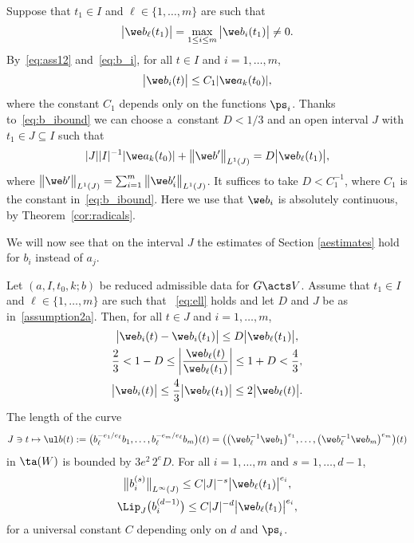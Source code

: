 Suppose that $t_1 \in I$ and $\ell \in \{1,\dots,m\}$ are such that
\begin{gather} \label{eq:ell}
\big |\we b_\ell(t_1)\big| = \max_{1 \le i \le m}\big |\we b_i(t_1)\big| \ne 0.
\end{gather}
By~\eqref{eq:ass12} and~\eqref{eq:b_i}, for all $t \in I$ and $i = 1,\dots,m$,
 \begin{gather} \label{eq:b_ibound}
\big|\we b_i(t) \big| \le C_1 |\we a_k (t_0)|,
 \end{gather}
where the constant $C_1$ depends only on the functions $\ps_i$.
Thanks to~\eqref{eq:b_ibound} we can choose
a~con\-stant $D< 1/3$ and an open interval $J$ with $t_1 \in J \subseteq I$ such that
\begin{gather} \label{assumption2a}
 | J| |I|^{-1} {|\we a_k(t_0)|}
 + \big\|\we b '\big\|_{L^1 (J)} = D \big|\we b_\ell(t_1)\big|,
\end{gather}
where $\big\|\we b '\big\|_{L^1 (J)} = \sum_{i=1}^m\big \|\we b_i '\big\|_{L^1 (J)}$.
It suffices to take $D < C_1^{-1}$, where $C_1$ is the constant in~\eqref{eq:b_ibound}.
Here we use that $\we b _i$ is absolutely continuous,
by Theorem~\ref{cor:radicals}.

We will now see that on the interval $J$ the estimates of Section \ref{aestimates} hold for $b_i$
instead of $a_j$.


\begin{Lemma} \label{lemB}
 Let $(a, I, t_0, k; b)$ be reduced admissible data for $G \acts V$.
 Assume that $t_1 \in I$ and $\ell \in \{1,\dots,m\}$ are such that
~\eqref{eq:ell} holds and
 let $D$ and $J$ be as in~\eqref{assumption2a}.
 Then,
 for all $t \in J$ and $i = 1,\dots,m$,
 \begin{gather}
 \big| \we b_i (t) - \we b_i (t_1)\big| \le D \big|\we b_\ell (t_1)\big|, \label{b1}
 \\
 \frac 2 3 < 1-D \le \left | \frac{\we b_\ell(t)}{\we b_\ell(t_1)} \right| \le 1+D < \frac 4 3,
 \label{b2}
 \\
 \big|\we b_i(t)\big|\le \frac 4 3 \big|\we b_\ell(t_1)\big| \le 2 \big|\we b_\ell(t)\big|. \label{b3}
 \end{gather}
 The length of the curve
 \begin{gather*}
 J \ni t \mapsto \ul b(t)
 := \big( b_\ell^{-e_1/e_\ell} b_1, \dots, b_\ell^{-e_m/e_\ell} b_{m}\big)(t)
 = \big( \big(\we b_\ell^{-1} \we b_1\big)^{e_1}, \dots, \big(\we b_\ell^{-1} \we b_m\big)^{e_m}\big)(t)
 \end{gather*}
 in $\ta(W)$ is bounded by $3 e^2\, 2^{e} D$.
 For all $ i = 1,\dots,m$ and $ s = 1,\dots,d-1$,
 \begin{gather}
 \big\| b_i^{(s)} \big\|_{L^\infty(J)} \le C |J|^{-s} \big|\we b_\ell (t_1)\big|^{e_i},\nonumber
 \\
 \Lip_J\big(b_i^{(d-1)}\big) \le C |J|^{-d} \big|\we b_\ell (t_1)\big|^{e_i},\label{b4}
 \end{gather}
 for a universal constant $C$ depending only on $d$ and $\ps_i$.
\end{Lemma}

